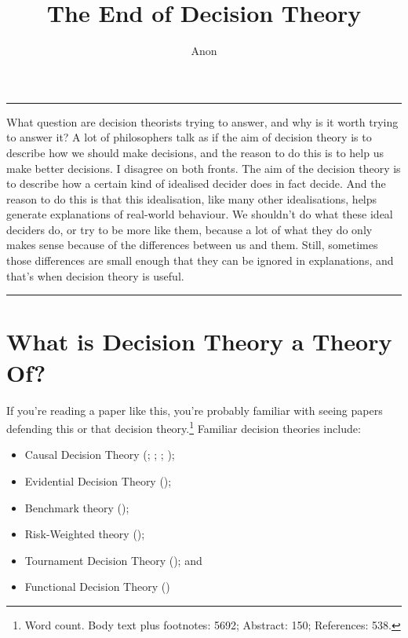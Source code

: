 \documentclass[
  12pt,
  letterpaper,
  DIV=11,
  numbers=noendperiod,
  twoside]{scrartcl}
\title{The End of Decision Theory}
\author{Anon}
\date{}
\providecommand{\tightlist}{%
  \setlength{\itemsep}{0pt}\setlength{\parskip}{0pt}}
\renewenvironment{abstract}
 {\vspace{-1.25cm}
 \quotation\small\noindent\rule{\linewidth}{.5pt}\par\smallskip
 \noindent }
 {\par\noindent\rule{\linewidth}{.5pt}\endquotation}
\begin{document}
\maketitle
\begin{abstract}
What question are decision theorists trying to answer, and why is it
worth trying to answer it? A lot of philosophers talk as if the aim of
decision theory is to describe how we should make decisions, and the
reason to do this is to help us make better decisions. I disagree on
both fronts. The aim of the decision theory is to describe how a certain
kind of idealised decider does in fact decide. And the reason to do this
is that this idealisation, like many other idealisations, helps generate
explanations of real-world behaviour. We shouldn't do what these ideal
deciders do, or try to be more like them, because a lot of what they do
only makes sense because of the differences between us and them. Still,
sometimes those differences are small enough that they can be ignored in
explanations, and that's when decision theory is useful.
\end{abstract}


\section{What is Decision Theory a Theory
Of?}\label{what-is-decision-theory-a-theory-of}

If you're reading a paper like this, you're probably familiar with
seeing papers defending this or that decision theory.\footnote{Word
  count. Body text plus footnotes: 5692; Abstract: 150; References: 538.}
Familiar decision theories include:

\begin{itemize}
\tightlist
\item
  Causal Decision Theory (; ;
  ; );
\item
  Evidential Decision Theory ();
\item
  Benchmark theory ();
\item
  Risk-Weighted theory ();
\item
  Tournament Decision Theory (); and
\item
  Functional Decision Theory
  ()
\end{itemize}
\end{document}
